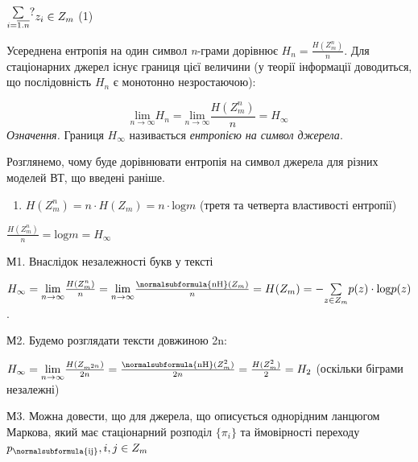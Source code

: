 {\centering
  $\begin{matrix}\underset{i=\overline{{1\text{.}n}}}{\sum }?\hfill\null
\end{matrix}{z_{{i}}\in Z_{{m}}}\hfill $  (1)
\par}

Усереднена ентропія на один символ \textit{n}{}-грами дорівнює 
${H_{{n}}=\frac{H(Z_{{m}}^{{n}})}{n}}$. Для стаціонарних джерел існує границя
цієї величини (у теорії інформації доводиться, що послідовність  ${H_{{n}}}$ є
монотонно незростаючою):

\begin{equation*}
{\underset{{n\rightarrow \infty }}{{\text{lim}}}H_{{n}}=\underset{{n\rightarrow
\infty }}{{\text{lim}}}\frac{H(Z_{{m}}^{{n}})}{n}=H_{{\infty }}}
\end{equation*}
\textit{Означення.} Границя  ${H_{{\infty }}}$ називається \textit{ентропією на
символ джерела}. 


\bigskip

Розглянемо, чому буде дорівнювати ентропія на символ джерела для різних моделей
ВТ, що введені раніше.

\liststyleWWviiiNumxvi
\begin{enumerate}
\item  ${H(Z_{{m}}^{{n}})=n\cdot H(Z_{{m}})=n\cdot \text{log}m}$ (третя та
четверта властивості ентропії)
\end{enumerate}
{\centering  ${\frac{H(Z_{{m}}^{{n}})}{n}=\text{log}m=H_{{\infty }}}$\par}

М1. Внаслідок незалежності букв у тексті

{\centering
 ${H_{{\infty }}=\underset{{n\rightarrow \infty
}}{{\text{lim}}}\frac{H(Z_{{m}}^{{n}})}{n}=\underset{{n\rightarrow \infty
}}{{\text{lim}}}\frac{\normalsubformula{\text{nH}}(Z_{{m}})}{n}=H(Z_{{m}})=-\underset{{z\in
Z_{{m}}}}{\sum }{p(z)\cdot \text{log}p(z)}}$.
\par}

М2. Будемо розглядати тексти довжиною 2n:

 ${H_{{\infty }}=\underset{{n\rightarrow \infty
}}{{\text{lim}}}\frac{H(Z_{{m}^{{2n}}})}{2n}=\frac{\normalsubformula{\text{nH}}(Z_{{m}}^{{2}})}{2n}=\frac{H(Z_{{m}}^{{2}})}{2}=H_{{2}}}$
(оскільки біграми незалежні)

М3. Можна довести, що для джерела, що описується однорідним ланцюгом Маркова,
який має стаціонарний розподіл  ${\{\pi _{{i}}\}}$ та ймовірності переходу 
${p_{{\normalsubformula{\text{ij}}}},i,j\in Z_{{m}}}$

